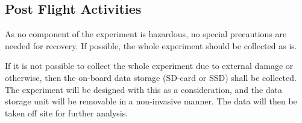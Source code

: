 \subsection{Post Flight Activities}
As no component of the experiment is hazardous, no special precautions are needed for recovery. If possible, the whole experiment should be collected as is.

If it is not possible to collect the whole experiment due to external damage or otherwise, then the on-board data storage (SD-card or SSD) shall be collected. The experiment will be designed with this as a consideration, and the data storage unit will be removable in a non-invasive manner. The data will then be taken off site for further analysis. 




